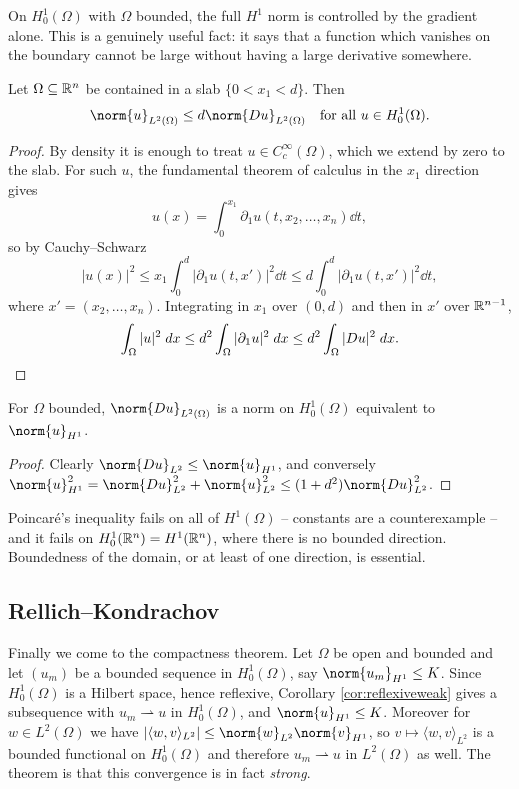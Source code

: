 \documentclass[a4paper]{scrartcl}
\newcommand{\ip}[2]{\langle #1, #2 \rangle}
\newcommand{\weakto}{\rightharpoonup}
\begin{document}
On $H_0^1(\Omega)$ with $\Omega$ bounded, the full $H^1$ norm is controlled by the gradient alone. This is a genuinely useful fact: it says that a function which vanishes on the boundary cannot be large without having a large derivative somewhere.

\begin{theorem}[Poincar\'e]\label{thm:poincare}
	Let $\Omega\subseteq\mathbb{R}^n$ be contained in a slab $\{0<x_1<d\}$. Then
	$$\norm{u}_{L^2(\Omega)}\le d\norm{Du}_{L^2(\Omega)} \quad \text{for all } u \in H_0^1(\Omega).$$
\end{theorem}

\begin{proof}
	By density it is enough to treat $u \in C_c^\infty(\Omega)$, which we extend by zero to the slab. For such $u$, the fundamental theorem of calculus in the $x_1$ direction gives
	$$u(x)=\int_0^{x_1}\partial_1u(t,x_2,\dots,x_n)\dd t,$$
	so by Cauchy--Schwarz
	$$|u(x)|^2\le x_1\int_0^{d}|\partial_1u(t,x')|^2\dd t \le d\int_0^d|\partial_1u(t,x')|^2\dd t,$$
	where $x'=(x_2,\dots,x_n)$. Integrating in $x_1$ over $(0,d)$ and then in $x'$ over $\mathbb{R}^{n-1}$,
	$$\int_\Omega|u|^2\; d x \le d^2\int_\Omega|\partial_1u|^2\; d x\le d^2\int_\Omega|Du|^2\; d x. \qedhere$$
\end{proof}

\begin{corollary}\label{cor:equivnorm}
	For $\Omega$ bounded, $\norm{Du}_{L^2(\Omega)}$ is a norm on $H_0^1(\Omega)$ equivalent to $\norm{u}_{H^1}$.
\end{corollary}

\begin{proof}
	Clearly $\norm{Du}_{L^2}\le\norm{u}_{H^1}$, and conversely $\norm{u}^2_{H^1}=\norm{Du}^2_{L^2}+\norm{u}^2_{L^2}\le(1+d^2)\norm{Du}^2_{L^2}$.
\end{proof}

Poincar\'e's inequality fails on all of $H^1(\Omega)$ -- constants are a counterexample -- and it fails on $H_0^1(\mathbb{R}^n)=H^1(\mathbb{R}^n)$, where there is no bounded direction. Boundedness of the domain, or at least of one direction, is essential.

\subsection{Rellich--Kondrachov}

Finally we come to the compactness theorem. Let $\Omega$ be open and bounded and let $(u_m)$ be a bounded sequence in $H_0^1(\Omega)$, say $\norm{u_m}_{H^1}\le K$. Since $H_0^1(\Omega)$ is a Hilbert space, hence reflexive, Corollary \ref{cor:reflexiveweak} gives a subsequence with $u_m\weakto u$ in $H_0^1(\Omega)$, and $\norm{u}_{H^1}\le K$. Moreover for $w \in L^2(\Omega)$ we have $|\ip{w}{v}_{L^2}|\le\norm{w}_{L^2}\norm{v}_{H^1}$, so $v \mapsto \ip{w}{v}_{L^2}$ is a bounded functional on $H_0^1(\Omega)$ and therefore $u_m\weakto u$ in $L^2(\Omega)$ as well. The theorem is that this convergence is in fact \emph{strong}.
\end{document}
